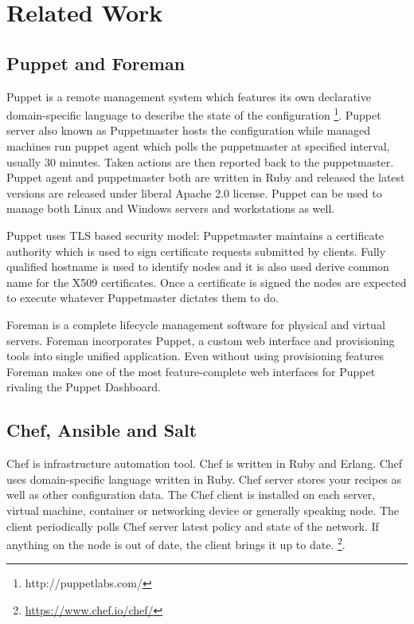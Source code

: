 \documentclass[a4paper,11pt]{kth-mag}
\begin{document}
\section{Related Work}
\label{sec:related}

\subsection{Puppet and Foreman}

Puppet is a remote management system which features its own declarative
domain-specific language to describe the state of the configuration
\footnote{http://puppetlabs.com/}. Puppet server also known as Puppetmaster
hosts the configuration while managed machines run puppet agent which polls
the puppetmaster at specified interval, usually 30 minutes. Taken actions
are then reported back to the puppetmaster. Puppet agent and puppetmaster
both are written in Ruby and released the latest versions are released under
liberal Apache 2.0 license. Puppet can be used to manage both Linux and
Windows servers and workstations as well.

Puppet uses TLS based security model:
Puppetmaster maintains a certificate authority which is used
to sign certificate requests submitted by clients.
Fully qualified hostname is used to identify nodes and
it is also used derive common name for the X509 certificates.
Once a certificate is signed the nodes are expected to
execute whatever Puppetmaster dictates them to do.

Foreman is a complete lifecycle management software for physical and virtual
servers. Foreman incorporates Puppet, a custom web interface and provisioning
tools into single unified application. Even without using provisioning features
Foreman makes one of the most feature-complete web interfaces for Puppet
rivaling the Puppet Dashboard.

\subsection{Chef, Ansible and Salt}

Chef is infrastructure automation tool. Chef is written in Ruby and Erlang.
Chef uses domain-specific language written in Ruby.
Chef server stores your recipes as well as other configuration data.
The Chef client is installed on each server, virtual machine, container
or networking device or generally speaking node.
The client periodically polls Chef server latest policy and
state of the network. If anything on the node is out of date,
the client brings it up to date. 
\footnote{\url{https://www.chef.io/chef/}}.
\end{document}
